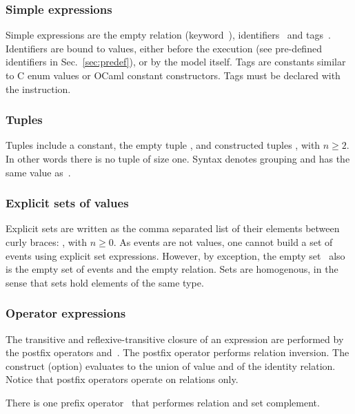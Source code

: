 \subsubsection*{Simple expressions}
Simple expressions are the empty relation (keyword~),
identifiers~ and tags~.
Identifiers are bound to values, either
before the execution (see pre-defined identifiers in Sec.~\ref{sec:predef}),
or by the model itself.
Tags are constants similar to C enum values or OCaml constant constructors.
Tags must be declared with the  instruction.

\subsubsection*{Tuples}
Tuples include a constant, the empty tuple \synt{\T{(}\T{)}},
and constructed tuples
,
with $n \geq 2$. In other words there is no tuple of size one.
Syntax  denotes grouping and has the same
value as~.


\subsubsection*{Explicit sets of values}
Explicit sets are written as the comma separated
list of their elements between curly braces:
,
with $n \geq 0$.
As events are not values, one cannot build a set of events using
explicit set expressions.
However, by exception, the empty set~\synt{\T{\{}\T{\}}}
also is the empty set of events and the empty relation.
Sets are homogenous, in the sense that sets hold elements of the same type.

\subsubsection*{Operator expressions}
The transitive and reflexive-transitive closure of an expression are performed
by the postfix operators \T{+} and~\T{*}.
The  postfix operator  performs relation inversion.
The construct  (option) evaluates to the union
of   value and of the identity relation.
Notice that postfix operators operate on relations only.

There is one prefix operator~\T{\textasciitilde} that performes
relation and set complement.

